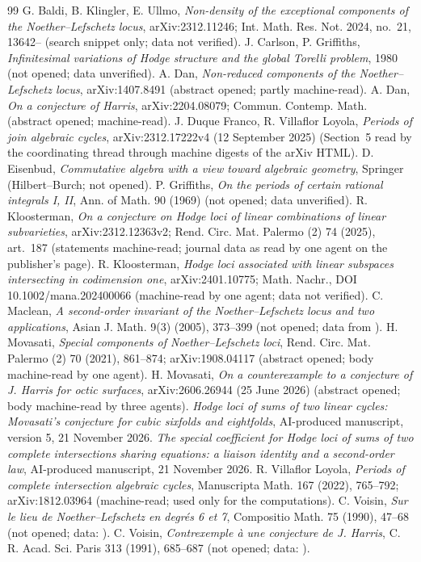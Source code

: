 \documentclass[11pt]{article}
\numberwithin{equation}{section}
\theoremstyle{remark}
\begin{document}
\begin{thebibliography}{99}\footnotesize\setlength{\itemsep}{0pt}\setlength{\parskip}{0pt}
 G. Baldi, B. Klingler, E. Ullmo, \emph{Non-density of the exceptional components of the
Noether--Lefschetz locus}, arXiv:2312.11246; Int. Math. Res. Not. 2024, no.~21, 13642-- (search snippet only; data not verified).
 J. Carlson, P. Griffiths, \emph{Infinitesimal variations of Hodge structure and the global Torelli
problem}, 1980 (not opened; data unverified).
 A. Dan, \emph{Non-reduced components of the Noether--Lefschetz locus}, arXiv:1407.8491 (abstract
opened; partly machine-read).
 A. Dan, \emph{On a conjecture of Harris}, arXiv:2204.08079; Commun. Contemp. Math. (abstract
opened; machine-read).
 J. Duque Franco, R. Villaflor Loyola, \emph{Periods of join algebraic cycles},
arXiv:2312.17222v4 (12 September 2025) (Section~5 read by the coordinating thread through machine digests of the
arXiv HTML).
 D. Eisenbud, \emph{Commutative algebra with a view toward algebraic geometry}, Springer
(Hilbert--Burch; not opened).
 P. Griffiths, \emph{On the periods of certain rational integrals I, II}, Ann. of Math. 90 (1969)
(not opened; data unverified).
 R. Kloosterman, \emph{On a conjecture on Hodge loci of linear combinations of linear subvarieties},
arXiv:2312.12363v2; Rend. Circ. Mat. Palermo (2) 74 (2025), art.~187 (statements
machine-read; journal data as read by one agent on the publisher's page).
 R. Kloosterman, \emph{Hodge loci associated with linear subspaces intersecting in codimension
one}, arXiv:2401.10775; Math. Nachr., DOI 10.1002/mana.202400066 (machine-read by one agent; data not verified).
 C. Maclean, \emph{A second-order invariant of the Noether--Lefschetz locus and two applications},
Asian J. Math. 9(3) (2005), 373--399 (not opened; data from \cite{Mo21}).
 H. Movasati, \emph{Special components of Noether--Lefschetz loci}, Rend. Circ. Mat. Palermo (2)
70 (2021), 861--874; arXiv:1908.04117 (abstract opened; body machine-read by one agent).
 H. Movasati, \emph{On a counterexample to a conjecture of J. Harris for octic surfaces},
arXiv:2606.26944 (25 June 2026) (abstract opened; body machine-read by three agents).
 \emph{Hodge loci of sums of two linear cycles: Movasati's conjecture for cubic sixfolds and
eightfolds}, AI-produced manuscript, version 5, 21 November 2026.
 \emph{The special coefficient for Hodge loci of sums of two complete intersections sharing
equations: a liaison identity and a second-order law}, AI-produced manuscript, 21 November 2026.
 R. Villaflor Loyola, \emph{Periods of complete intersection algebraic cycles}, Manuscripta Math. 167
(2022), 765--792; arXiv:1812.03964 (machine-read; used only for the computations).
 C. Voisin, \emph{Sur le lieu de Noether--Lefschetz en degr\'es 6 et 7}, Compositio Math. 75
(1990), 47--68 (not opened; data: \cite{Mo21}).
 C. Voisin, \emph{Contrexemple \`a une conjecture de J. Harris}, C. R. Acad. Sci. Paris 313 (1991),
685--687 (not opened; data: \cite{Mo21}).
\end{thebibliography}
\end{document}
